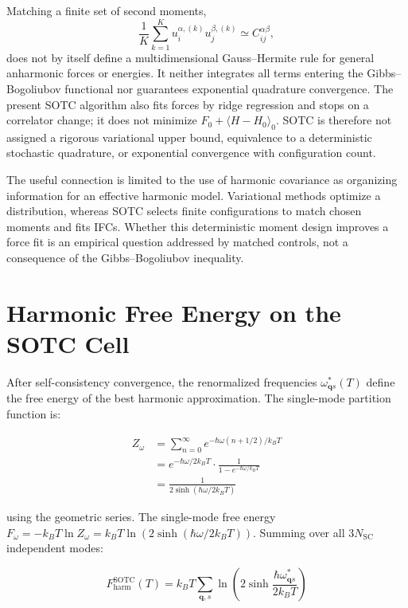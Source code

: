 \documentclass[aps,prb,reprint,amsmath,amssymb,floatfix]{revtex4-2}
\begin{document}
\color{revisionblue}
Matching a finite set of second moments,
\[
\frac{1}{K}\sum_{k=1}^{K}u_i^{\alpha,(k)}u_j^{\beta,(k)}
 \simeq C_{ij}^{\alpha\beta},
\]
does not by itself define a multidimensional Gauss--Hermite rule for general
anharmonic forces or energies. It neither integrates all terms entering the
Gibbs--Bogoliubov functional nor guarantees exponential quadrature convergence.
The present SOTC algorithm also fits forces by ridge regression and stops on a
correlator change; it does not minimize \(F_0+\langle H-H_0\rangle_0\).
SOTC is therefore not assigned a rigorous variational upper bound,
equivalence to a deterministic stochastic quadrature, or exponential
convergence with configuration count.
\color{black}

\color{revisionblue}
The useful connection is limited to the use of harmonic covariance as
organizing information for an effective harmonic model. Variational methods
optimize a distribution, whereas SOTC selects finite configurations to match
chosen moments and fits IFCs. Whether this deterministic moment design improves
a force fit is an empirical question addressed by matched controls, not a
consequence of the Gibbs--Bogoliubov inequality.
\color{black}

\section{Harmonic Free Energy on the SOTC
Cell}\label{appendix-h-harmonic-free-energy-on-the-sotc-cell}

After self-consistency convergence, the renormalized frequencies
\(\omega_{\mathbf{q}s}^*(T)\) define the free energy of the best
harmonic approximation. The single-mode partition function is:

\begin{align*}
Z_\omega
  &= \sum_{n=0}^\infty e^{-\hbar\omega(n+1/2)/k_BT} \\
  &= e^{-\hbar\omega/2k_BT}\cdot\frac{1}{1-e^{-\hbar\omega/k_BT}} \\
  &= \frac{1}{2\sinh(\hbar\omega/2k_BT)}
\end{align*}

using the geometric series. The single-mode free energy
\(F_\omega = -k_BT\ln Z_\omega = k_BT\ln(2\sinh(\hbar\omega/2k_BT))\).
Summing over all \(3N_\text{SC}\) independent modes:

\begin{equation*}
\boxed{F_\text{harm}^\text{SOTC}(T) = k_BT\sum_{\mathbf{q},s}\ln\!\left(2\sinh\frac{\hbar\omega_{\mathbf{q}s}^*}{2k_BT}\right)}
\end{equation*}
\end{document}
